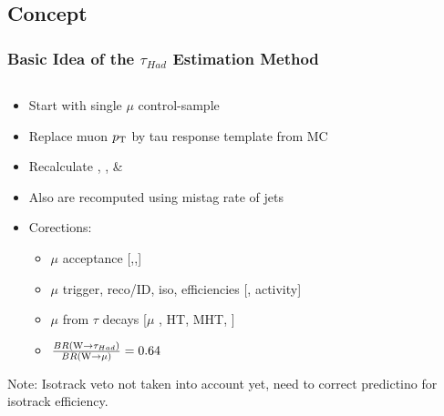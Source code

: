 \documentclass{beamer}
\begin{document}
\subsection{Concept}
\begin{frame}
 \frametitle{Basic Idea of the $\tau_{Had}$ Estimation Method}
 
    \begin{columns}
        \begin{column}{0.60\textwidth}
        \begin{itemize}
         \item Start with single $\mu$ control-sample
         \item Replace muon $p_{\text{T}}$ by tau response template from MC
         \item Recalculate \HT, \MHT, \NJets \& \met
         \item Also \BTags are recomputed using mistag rate of \hadtau jets
         \item Corections:
         \begin{itemize}
          \item $\mu$ acceptance [\HT,\MHT,\NJets]
          \item $\mu$ trigger, reco/ID, iso, efficiencies [\pt, activity]
          \item $\mu$ from $\tau$ decays [$\mu$ \pt, HT, MHT, \NJets]
          \item $\frac{BR(\text{W}\rightarrow\tau_{Had})}{BR(\text{W}\rightarrow\mu)}=0.64$
         \end{itemize}

        \end{itemize}
        Note: Isotrack veto not taken into account yet, need to correct predictino for isotrack efficiency.
        

        
    

\end{column}
\end{columns}
\end{frame}
\end{document}

